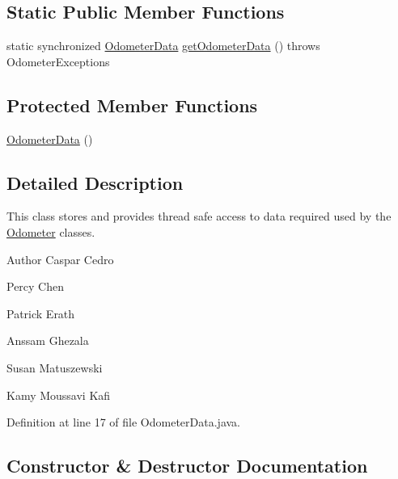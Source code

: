 \subsection*{Static Public Member Functions}
\begin{DoxyCompactItemize}
\item 
static synchronized \hyperlink{classca_1_1mcgill_1_1ecse211_1_1odometer_1_1_odometer_data}{Odometer\+Data} \hyperlink{classca_1_1mcgill_1_1ecse211_1_1odometer_1_1_odometer_data_afff2d760dd1f861b580f3eacef37f1cc}{get\+Odometer\+Data} ()  throws Odometer\+Exceptions 
\end{DoxyCompactItemize}
\subsection*{Protected Member Functions}
\begin{DoxyCompactItemize}
\item 
\hyperlink{classca_1_1mcgill_1_1ecse211_1_1odometer_1_1_odometer_data_a91412854b75c41bf3af7c8892ec0fe87}{Odometer\+Data} ()
\end{DoxyCompactItemize}


\subsection{Detailed Description}
This class stores and provides thread safe access to data required used by the \hyperlink{classca_1_1mcgill_1_1ecse211_1_1odometer_1_1_odometer}{Odometer} classes.

\begin{DoxyAuthor}{Author}
Caspar Cedro 

Percy Chen 

Patrick Erath 

Anssam Ghezala 

Susan Matuszewski 

Kamy Moussavi Kafi 
\end{DoxyAuthor}


Definition at line 17 of file Odometer\+Data.\+java.



\subsection{Constructor \& Destructor Documentation}
\mbox{\label{classca_1_1mcgill_1_1ecse211_1_1odometer_1_1_odometer_data_a91412854b75c41bf3af7c8892ec0fe87}} 
